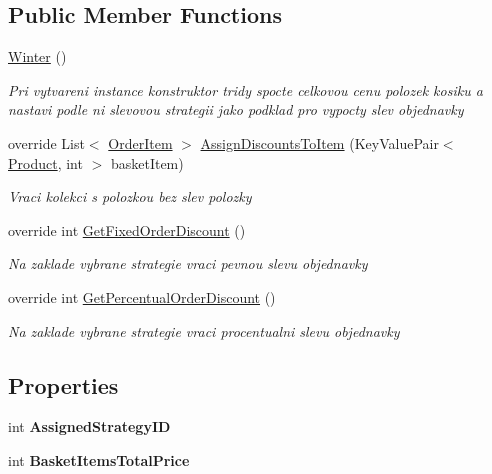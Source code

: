 \subsection*{Public Member Functions}
\begin{DoxyCompactItemize}
\item 
\mbox{\hyperlink{class_eshop_1_1_winter_a1fba448a83d80ce1cc8dc4d7e0da88e8}{Winter}} ()
\begin{DoxyCompactList}\small\item\em Pri vytvareni instance konstruktor tridy spocte celkovou cenu polozek kosiku a nastavi podle ni slevovou strategii jako podklad pro vypocty slev objednavky \end{DoxyCompactList}\item 
override List$<$ \mbox{\hyperlink{class_eshop_1_1_order_item}{Order\+Item}} $>$ \mbox{\hyperlink{class_eshop_1_1_winter_af4d2ccd9c970acc2d61ef67ef0ca8c9d}{Assign\+Discounts\+To\+Item}} (Key\+Value\+Pair$<$ \mbox{\hyperlink{class_eshop_1_1_product}{Product}}, int $>$ basket\+Item)
\begin{DoxyCompactList}\small\item\em Vraci kolekci s polozkou bez slev polozky \end{DoxyCompactList}\item 
override int \mbox{\hyperlink{class_eshop_1_1_winter_a0ddc9d5825968a20d65e8dfbed375c86}{Get\+Fixed\+Order\+Discount}} ()
\begin{DoxyCompactList}\small\item\em Na zaklade vybrane strategie vraci pevnou slevu objednavky \end{DoxyCompactList}\item 
override int \mbox{\hyperlink{class_eshop_1_1_winter_acb309c44d4b485d42b00e4b9ee0b29ba}{Get\+Percentual\+Order\+Discount}} ()
\begin{DoxyCompactList}\small\item\em Na zaklade vybrane strategie vraci procentualni slevu objednavky \end{DoxyCompactList}\end{DoxyCompactItemize}
\subsection*{Properties}
\begin{DoxyCompactItemize}
\item 
\mbox{\label{class_eshop_1_1_winter_a9d657918bc4414cac02bf72401b73504}} 
int {\bfseries Assigned\+Strategy\+ID}
\item 
\mbox{\label{class_eshop_1_1_winter_a1028e85ec7bdae0c4eddf8363c978ea5}} 
int {\bfseries Basket\+Items\+Total\+Price}
\end{DoxyCompactItemize}
